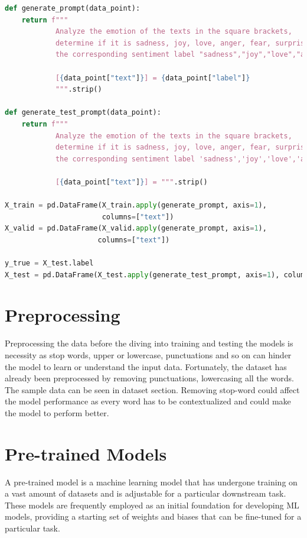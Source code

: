 \begin{lstlisting}[language=Python, caption=The code for adding an additional prompt before the sentences, label=lst:prompt_adding]
def generate_prompt(data_point):
    return f"""
            Analyze the emotion of the texts in the square brackets,
            determine if it is sadness, joy, love, anger, fear, surprise, and return the answer as
            the corresponding sentiment label "sadness","joy","love","anger", "fear", "surprise".

            [{data_point["text"]}] = {data_point["label"]}
            """.strip()

def generate_test_prompt(data_point):
    return f"""
            Analyze the emotion of the texts in the square brackets,
            determine if it is sadness, joy, love, anger, fear, surprise, and return the answer as
            the corresponding sentiment label 'sadness','joy','love','anger', 'fear', 'surprise'.

            [{data_point["text"]}] = """.strip()

X_train = pd.DataFrame(X_train.apply(generate_prompt, axis=1),
                       columns=["text"])
X_valid = pd.DataFrame(X_valid.apply(generate_prompt, axis=1),
                      columns=["text"])

y_true = X_test.label
X_test = pd.DataFrame(X_test.apply(generate_test_prompt, axis=1), columns=["text"])
\end{lstlisting}


\section{Preprocessing}
Preprocessing the data before the diving into training and testing the models is necessity as stop words, upper or lowercase, punctuations and so on can hinder the model to learn or understand the input data. Fortunately, the dataset has already been preprocessed by removing punctuations, lowercasing all the words. The sample data can be seen in dataset section. Removing stop-word could affect the model performance as every word has to be contextualized and could make the model to perform better.

\section{Pre-trained Models}

A pre-trained model is a machine learning model that has undergone training on a vast amount of datasets and is adjustable for a particular downstream task. These models are frequently employed as an initial foundation for developing ML models, providing a starting set of weights and biases that can be fine-tuned for a particular task.

